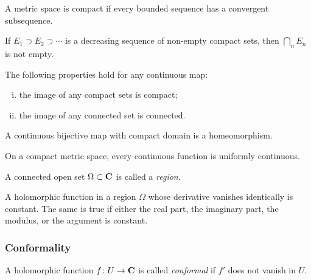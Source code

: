 \begin{corollary}
  A metric space is compact if every bounded sequence has a convergent subsequence.
\end{corollary}

\begin{proposition}
  If $E_1 \supset E_2 \supset \cdots$ is a decreasing sequence of non-empty compact sets, then $\bigcap_n E_n$ is not empty.
\end{proposition}

\begin{proposition}
  The following properties hold for any continuous map:
  \begin{enumerate}[(i)]
  \item the image of any compact sets is compact;
  \item the image of any connected set is connected.
  \end{enumerate}
\end{proposition}

\begin{corollary}
  A continuous bijective map with compact domain is a homeomorphism.
\end{corollary}

\begin{proposition}
  On a compact metric space, every continuous function is uniformly continuous.
\end{proposition}

\begin{definition}
  A connected open set $\Omega \subset \mathbf{C}$ is called a \emph{region}.
\end{definition}

\begin{theorem}
  A holomorphic function in a region $\Omega$ whose derivative vanishes identically is constant. The same is true if either the real part, the imaginary part, the modulus, or the argument is constant.
\end{theorem}

\subsubsection{Conformality}

\begin{definition}
  A holomorphic function $f \colon U \rightarrow \mathbf{C}$ is called \emph{conformal} if $f'$ does not vanish in $U$.
\end{definition}

